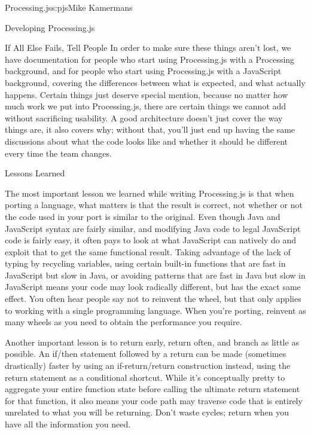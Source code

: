 \begin{aosachapter}{Processing.js}{s:pjs}{Mike Kamermans}
\begin{aosasect1}{Developing Processing.js}
\begin{aosasect2}{If All Else Fails, Tell People}
In order to make sure these things aren't lost, we have documentation
for people who start using Processing.js with a Processing
background, and for people who start using Processing.js with a JavaScript
background, covering the differences between what is expected, and
what actually happens. Certain things just deserve special mention,
because no matter how much work we put into Processing.js, there are
certain things we cannot add without sacrificing usability. A good
architecture doesn't just cover the way things are, it also covers
why; without that, you'll just end up having the same discussions
about what the code looks like and whether it should be different
every time the team changes.

\end{aosasect2}

\end{aosasect1}

\begin{aosasect1}{Lessons Learned}

The most important lesson we learned while writing Processing.js is
that when porting a language, what matters is that the result is
correct, not whether or not the code used in your port is similar to
the original. Even though Java and JavaScript syntax are fairly similar,
and modifying Java code to legal JavaScript code is
fairly easy, it often pays to look at what JavaScript can natively
do and exploit that to get the same functional result. Taking
advantage of the lack of typing by recycling variables, using certain
built-in functions that are fast in JavaScript but slow in Java, or
avoiding patterns that are fast in Java but slow in JavaScript means
your code may look radically different, but has the exact same
effect. You often hear people say not to reinvent the wheel, but that
only applies to working with a single programming language. When
you're porting, reinvent as many wheels as you need to obtain the
performance you require.

Another important lesson is to return early, return often, and branch
as little as possible. An if/then statement followed by a return can
be made (sometimes drastically) faster by using an if-return/return
construction instead, using the return statement as a conditional
shortcut. While it's conceptually pretty to aggregate your entire
function state before calling the ultimate return statement for that
function, it also means your code path may traverse code that is
entirely unrelated to what you will be returning. Don't waste cycles;
return when you have all the information you need.


\end{aosasect1}
\end{aosachapter}
